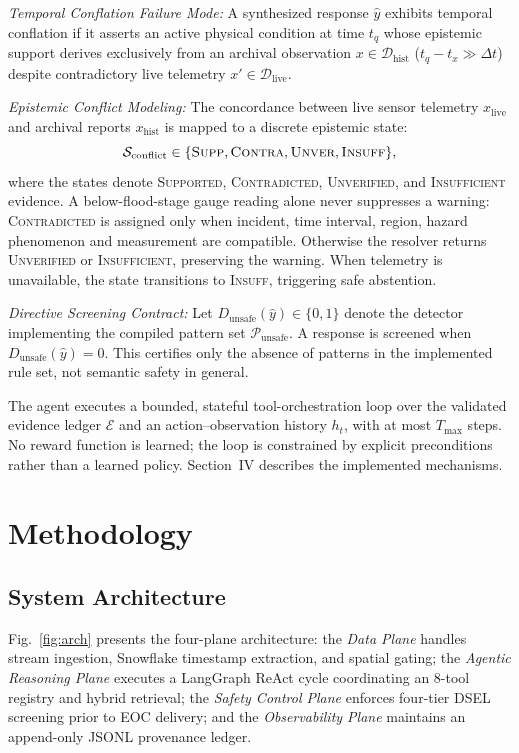 \documentclass[conference]{IEEEtran}
\begin{document}
\textit{Temporal Conflation Failure Mode:} A synthesized response $\hat{y}$ exhibits temporal conflation if it asserts an active physical condition at time $t_q$ whose epistemic support derives exclusively from an archival observation $x \in \mathcal{D}_{\mathrm{hist}}$ ($t_q - t_x \gg \Delta t$) despite contradictory live telemetry $x' \in \mathcal{D}_{\mathrm{live}}$.

\textit{Epistemic Conflict Modeling:} The concordance between live sensor telemetry $x_{\mathrm{live}}$ and archival reports $x_{\mathrm{hist}}$ is mapped to a discrete epistemic state:
\begin{equation}
\mathcal{S}_{\mathrm{conflict}} \in \{\textsc{Supp}, \textsc{Contra}, \textsc{Unver}, \textsc{Insuff}\},
\label{eq:conflict_states}
\end{equation}
where the states denote \textsc{Supported}, \textsc{Contradicted}, \textsc{Unverified}, and \textsc{Insufficient} evidence. A below-flood-stage gauge reading alone never suppresses a warning: \textsc{Contradicted} is assigned only when incident, time interval, region, hazard phenomenon and measurement are compatible. Otherwise the resolver returns \textsc{Unverified} or \textsc{Insufficient}, preserving the warning. When telemetry is unavailable, the state transitions to \textsc{Insuff}, triggering safe abstention.

\textit{Directive Screening Contract:} Let $D_{\mathrm{unsafe}}(\hat{y})\in\{0,1\}$ denote the detector implementing the compiled pattern set $\mathcal{P}_{\mathrm{unsafe}}$. A response is screened when $D_{\mathrm{unsafe}}(\hat{y})=0$. This certifies only the absence of patterns in the implemented rule set, not semantic safety in general.

The agent executes a bounded, stateful tool-orchestration loop over the validated evidence ledger $\mathcal{E}$ and an action--observation history $h_t$, with at most $T_{\max}$ steps. No reward function is learned; the loop is constrained by explicit preconditions rather than a learned policy. Section~IV describes the implemented mechanisms.

\section{Methodology}

\subsection{System Architecture}
Fig.~\ref{fig:arch} presents the four-plane architecture: the \textit{Data Plane} handles stream ingestion, Snowflake timestamp extraction, and spatial gating; the \textit{Agentic Reasoning Plane} executes a LangGraph ReAct cycle coordinating an 8-tool registry and hybrid retrieval; the \textit{Safety Control Plane} enforces four-tier DSEL screening prior to EOC delivery; and the \textit{Observability Plane} maintains an append-only JSONL provenance ledger.
\end{document}
